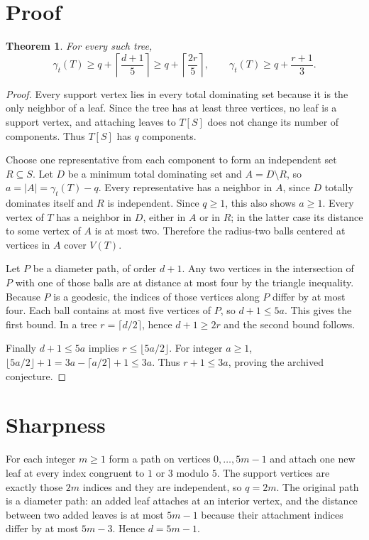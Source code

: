 \documentclass[11pt]{article}
\newtheorem{theorem}{Theorem}
\begin{document}
\section{Proof}
\begin{theorem}
For every such tree,
\[
 \gamma_t(T)\ge q+\left\lceil\frac{d+1}{5}\right\rceil
 \ge q+\left\lceil\frac{2r}{5}\right\rceil,
 \qquad
 \gamma_t(T)\ge q+\frac{r+1}{3}.
\]
\end{theorem}
\begin{proof}
Every support vertex lies in every total dominating set because it is the only neighbor of a leaf. Since the tree has at least three vertices, no leaf is a support vertex, and attaching leaves to $T[S]$ does not change its number of components. Thus $T[S]$ has $q$ components.

Choose one representative from each component to form an independent set $R\subseteq S$. Let $D$ be a minimum total dominating set and $A=D\setminus R$, so $a=|A|=\gamma_t(T)-q$. Every representative has a neighbor in $A$, since $D$ totally dominates itself and $R$ is independent. Since $q\ge1$, this also shows $a\ge1$. Every vertex of $T$ has a neighbor in $D$, either in $A$ or in $R$; in the latter case its distance to some vertex of $A$ is at most two. Therefore the radius-two balls centered at vertices in $A$ cover $V(T)$.

Let $P$ be a diameter path, of order $d+1$. Any two vertices in the intersection of $P$ with one of those balls are at distance at most four by the triangle inequality. Because $P$ is a geodesic, the indices of those vertices along $P$ differ by at most four. Each ball contains at most five vertices of $P$, so $d+1\le5a$. This gives the first bound. In a tree $r=\lceil d/2\rceil$, hence $d+1\ge2r$ and the second bound follows.

Finally $d+1\le5a$ implies $r\le\lfloor5a/2\rfloor$. For integer $a\ge1$, $\lfloor5a/2\rfloor+1=3a-\lceil a/2\rceil+1\le3a$. Thus $r+1\le3a$, proving the archived conjecture.
\end{proof}
\section{Sharpness}
For each integer $m\ge1$ form a path on vertices $0,\ldots,5m-1$ and attach one new leaf at every index congruent to $1$ or $3$ modulo $5$. The support vertices are exactly those $2m$ indices and they are independent, so $q=2m$. The original path is a diameter path: an added leaf attaches at an interior vertex, and the distance between two added leaves is at most $5m-1$ because their attachment indices differ by at most $5m-3$. Hence $d=5m-1$.
\end{document}
